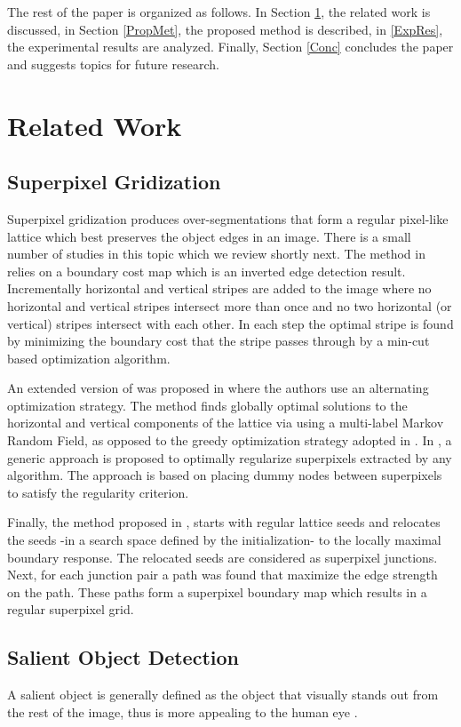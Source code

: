 \documentclass[a4paper,conference]{IEEEtran}
\begin{document}
The rest of the paper is organized as follows. In Section \ref{RelWork}, the related work is discussed, in Section \ref{PropMet}, the proposed method is described, in \ref{ExpRes}, the experimental results are analyzed. Finally, Section \ref{Conc} concludes the paper and suggests topics for future research.


\section{Related Work} \label{RelWork}
\subsection{Superpixel Gridization}
Superpixel gridization produces over-segmentations that form a regular pixel-like lattice which best preserves the object edges in an image.
There is a small number of studies in this topic which we review shortly next.
The method in \cite{Moore} relies on a boundary cost map which is an inverted edge detection result. Incrementally horizontal and vertical stripes are added to the image where no horizontal and vertical stripes intersect more than once and no two horizontal (or vertical) stripes intersect with each other. In each step the optimal stripe is found by minimizing the boundary cost that the stripe passes through by a min-cut based optimization algorithm.

An extended version of \cite{Moore} was proposed in \cite{Moore2} where the authors use an alternating optimization strategy. The method finds globally optimal solutions to the horizontal and vertical components of the lattice via using a multi-label Markov Random Field, as opposed to the greedy optimization strategy adopted in \cite{Moore}.
In \cite{Li1}, a generic approach is proposed to optimally regularize superpixels extracted by any algorithm. The approach is based on placing dummy nodes between superpixels to satisfy the regularity criterion.

Finally, the method proposed in \cite{Fu}, starts with regular lattice seeds and relocates the seeds -in a search space defined by the initialization- to the locally maximal boundary response. The relocated seeds are considered as superpixel junctions. Next, for each junction pair a path was found that maximize the edge strength on the path. These paths form a superpixel boundary map which results in a regular superpixel grid.

\subsection{Salient Object Detection}
A salient object is generally defined as the object that visually stands out from the rest of the image, thus is more appealing to the human eye \cite{Borji1}.
\end{document}
